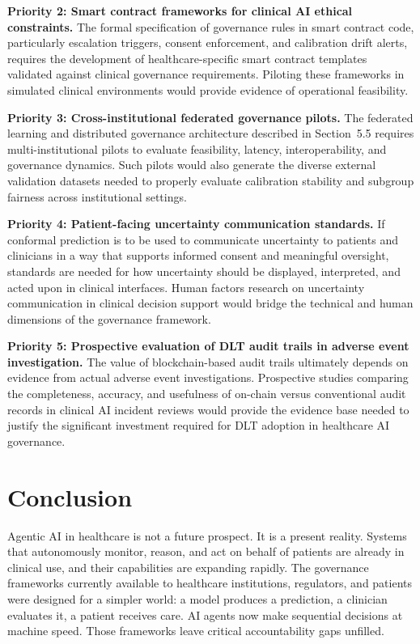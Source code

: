\textbf{Priority 2: Smart contract frameworks for clinical AI ethical
constraints.} The formal specification of governance rules in smart
contract code, particularly escalation triggers, consent enforcement,
and calibration drift alerts, requires the development of
healthcare-specific smart contract templates validated against clinical
governance requirements. Piloting these frameworks in simulated clinical
environments would provide evidence of operational feasibility.

\textbf{Priority 3: Cross-institutional federated governance pilots.}
The federated learning and distributed governance architecture described
in Section~5.5 requires multi-institutional pilots to evaluate
feasibility, latency, interoperability, and governance dynamics. Such
pilots would also generate the diverse external validation datasets
needed to properly evaluate calibration stability and subgroup fairness
across institutional settings.

\textbf{Priority 4: Patient-facing uncertainty communication standards.}
If conformal prediction is to be used to communicate uncertainty to
patients and clinicians in a way that supports informed consent and
meaningful oversight, standards are needed for how uncertainty should be
displayed, interpreted, and acted upon in clinical interfaces. Human
factors research on uncertainty communication in clinical decision
support would bridge the technical and human dimensions of the
governance framework.

\textbf{Priority 5: Prospective evaluation of DLT audit trails in
adverse event investigation.} The value of blockchain-based audit trails
ultimately depends on evidence from actual adverse event investigations.
Prospective studies comparing the completeness, accuracy, and usefulness
of on-chain versus conventional audit records in clinical AI incident
reviews would provide the evidence base needed to justify the
significant investment required for DLT adoption in healthcare AI
governance.


\section{Conclusion}\label{conclusion}

Agentic AI in healthcare is not a future prospect. It is a present
reality. Systems that autonomously monitor, reason, and act on behalf of
patients are already in clinical use, and their capabilities are
expanding rapidly. The governance frameworks currently available to
healthcare institutions, regulators, and patients were designed for a
simpler world: a model produces a prediction, a clinician evaluates it,
a patient receives care. AI agents now make sequential decisions at
machine speed. Those frameworks leave critical accountability gaps
unfilled.

